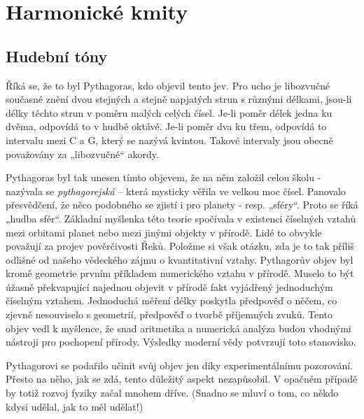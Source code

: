 \chapter{Harmonické kmity}\label{fyz:IchapL}
\minitoc
\section{Hudební tóny}\label{fyz:IchapLsecI}
  Říká se, že to byl Pythagoras, kdo objevil tento jev. Pro ucho je libozvučné současné znění 
  dvou stejných a stejně napjatých strun s různými délkami, jsou-li délky těchto strun v poměru 
  malých celých čísel. Je-li poměr délek jedna ku dvěma, odpovídá to v hudbě oktávě. Je-li poměr 
  dva ku třem, odpovídá to intervalu mezi C a G, který se nazývá kvintou. Takové intervaly jsou 
  obecně považovány za „libozvučné“ akordy. 
  
  Pythagoras byl tak unesen tímto objevem, že na něm založil celou školu - nazývala se 
  \emph{pythagorejská} – která mysticky věřila ve velkou moc čísel. Panovalo přesvědčení, že něco 
  podobného se zjistí i pro planety - resp. „sféry“. Proto  se říká „hudba sfér“. Základní 
  myšlenka této teorie spočívala v existenci číselných vztahů mezi orbitami planet nebo mezi 
  jinými objekty v přírodě. Lidé to obvykle považují za projev pověrčivosti Řeků. Položme si však 
  otázku, zda je to tak příliš odlišné od našeho vědeckého zájmu o kvantitativní vztahy. 
  Pythagorův objev byl kromě geometrie prvním příkladem numerického vztahu v přírodě. Muselo to 
  být úžasně překvapující najednou objevit v přírodě fakt vyjádřený jednoduchým číselným vztahem. 
  Jednoduchá měření délky poskytla předpověď o něčem, co zjevně nesouviselo s geometrií,   
  předpověď o tvorbě příjemných zvuků. Tento objev vedl k myšlence, že snad aritmetika a   
  numerická analýza budou vhodnými nástroji pro pochopení přírody. Výsledky moderní vědy 
  potvrzují toto stanovisko.
   
  Pythagorovi se podařilo učinit svůj objev jen díky experimentálnímu pozorování. Přesto na něho, 
  jak se zdá, tento důležitý aspekt nezapůsobil. V opačném případě by totiž rozvoj fyziky začal 
  mnohem dříve. (Snadno se mluví o tom, co někdo kdysi udělal, jak to měl udělat!) 
    
